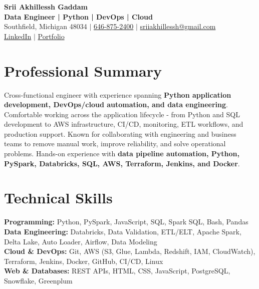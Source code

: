 \documentclass[letterpaper,10pt]{article}
\begin{document}
\fontsize{9.35pt}{10.45pt}\selectfont

\begin{center}
    {\LARGE \textbf{Srii Akhillessh Gaddam}} \\[-1pt]
    \textbf{Data Engineer | Python | DevOps | Cloud} \\[2pt]
    Southfield, Michigan 48034 $|$
    \href{tel:6468752400}{646-875-2400} $|$
    \href{mailto:sriiakhillessh@gmail.com}{sriiakhillessh@gmail.com} \\[1pt]
    \href{https://www.linkedin.com/in/srii-akhiilessh-gaddam-b48668191/}{LinkedIn} $|$
    \href{https://sriiakhillesshg.github.io/portfolio/}{Portfolio}
\end{center}
\vspace{-8pt}

\section{Professional Summary}
\small{Cross-functional engineer with experience spanning \textbf{Python application development, DevOps/cloud automation, and data engineering}. Comfortable working across the application lifecycle - from Python and SQL development to AWS infrastructure, CI/CD, monitoring, ETL workflows, and production support. Known for collaborating with engineering and business teams to remove manual work, improve reliability, and solve operational problems. Hands-on experience with \textbf{data pipeline automation, Python, PySpark, Databricks, SQL, AWS, Terraform, Jenkins, and Docker}.}

\section{Technical Skills}
\small{
\textbf{Programming:} Python, PySpark, JavaScript, SQL, Spark SQL, Bash, Pandas \\
\textbf{Data Engineering:} Databricks, Data Validation, ETL/ELT, Apache Spark, Delta Lake, Auto Loader, Airflow, Data Modeling \\
\textbf{Cloud \& DevOps:} Git, AWS (S3, Glue, Lambda, Redshift, IAM, CloudWatch), Terraform, Jenkins, Docker, GitHub, CI/CD, Linux \\
\textbf{Web \& Databases:} REST APIs, HTML, CSS, JavaScript, PostgreSQL, Snowflake, Greenplum
}

\end{document}
